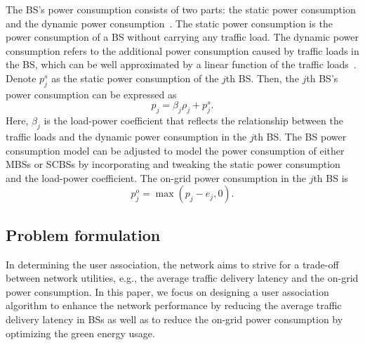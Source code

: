 \documentclass[journal]{IEEEtran}
\theoremstyle{definition}
\begin{document}
The BS's power consumption consists of two parts: the static power consumption and the dynamic power consumption~\cite{Auer:2011:HME}. The static power consumption is the power consumption of a BS without carrying any traffic load. The dynamic power consumption refers to the additional power consumption caused by traffic loads in the BS, which can be well approximated by a linear function of the traffic loads~\cite{Auer:2011:HME}. Denote $p^{s}_{j}$ as the static power consumption of the $j$th BS. Then, the $j$th BS's power consumption can be expressed as
\begin{equation}
\label{eq:bs_power_consumption}
p_{j}=\beta_{j}\rho_{j}+p^{s}_{j}.
\end{equation}
Here, $\beta_{j}$ is the load-power coefficient that reflects the relationship between the traffic loads and the dynamic power consumption in the $j$th BS. The BS power consumption model can be adjusted to model the power consumption of either MBSs or SCBSs by incorporating and tweaking the static power consumption and the load-power
coefficient. The on-grid power consumption in the $j$th BS is
\begin{equation}
\label{eq:bs_grid_energy}
p^{o}_{j}=\max{(p_{j}-e_{j},0)}.
\end{equation}

\subsection{Problem formulation}
In determining the user association, the network aims to strive for a trade-off between network utilities, e.g., the average traffic delivery latency and the on-grid power consumption. In this paper, we focus on designing a user association algorithm to enhance the network performance by reducing the average traffic delivery latency in BSs as well as to reduce the on-grid power consumption by optimizing the green energy usage.
\end{document}
